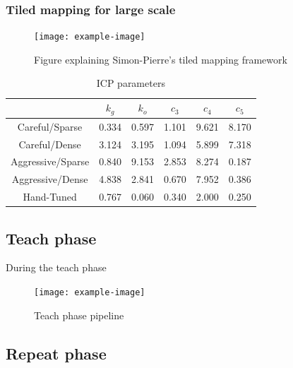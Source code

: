 \subsubsection{Tiled mapping for large scale}
\label{sec:tiled_map}
\lightlipsum[1]

\begin{figure} [htpb]
	\centering
	\texttt{[image: example-image]}
	\caption{Figure explaining Simon-Pierre's tiled mapping framework}
	\label{fig:tiled_map}
\end{figure}


\begin{table}[htpb]
	\caption{\ac{ICP} parameters} \label{tab:LTR-runs}
	\begin{center}
		\begin{tabular}{|c|c|c|c|c|c|}
			\hline
			& $k_{g}$ & $k_{o}$ & $c_{3}$ & $c_{4}$ & $c_{5}$ \\
			\hline\hline
			Careful/Sparse & 0.334 & 0.597 & 1.101 & 9.621 & 8.170 \\ \hline
			Careful/Dense & 3.124 & 3.195 & 1.094 & 5.899 & 7.318 \\ \hline
			Aggressive/Sparse & 0.840 & 9.153 & 2.853 & 8.274 & 0.187 \\ \hline
			Aggressive/Dense & 4.838 & 2.841 & 0.670 & 7.952 & 0.386 \\ \hline
			Hand-Tuned & 0.767 & 0.060 & 0.340 & 2.000 & 0.250 \\
			\hline
		\end{tabular}
	\end{center}
\end{table}

\subsection{Teach phase}
\label{sec:teach_phase}

During the teach phase
\lightlipsum[1]

\begin{figure} [htpb]
	\centering
	\texttt{[image: example-image]}
	\caption{Teach phase pipeline}
	\label{fig:teach_pipeline}
\end{figure}

\subsection{Repeat phase}
\label{sec:repeat_phase}

